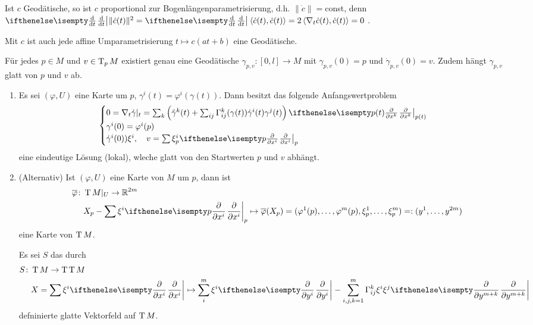 Ist $c$ Geodätische, so ist $c$ proportional zur Bogenlängenparametrisierung, d.h. $\|\dot c\| = $const, denn $\difffrac{}{t}\|\dot c(t)\|^{2} = \difffrac{}{t}\left<\dot c(t),\dot c(t) \right> = 2\left<\nabla_t\dot c(t), \dot c(t)\right> = 0$ .

Mit $c$ ist auch jede affine Umparametrisierung $t \mapsto c(at + b)$ eine Geodätische.

\begin{Prop}
  Für jedes $p \in M$ und $v \in \operatorname{T}_pM$ existiert genau eine Geodätische $\gamma_{p,v}\colon[0,l] \to M$ mit $\gamma_{p,v}(0) = p$ und $\dot \gamma_{p,v}(0) = v$.
Zudem hängt $\gamma_{p,v}$ glatt von $p$ und $v$ ab.
\end{Prop}

\begin{bew}
  \begin{enumerate}[label=(\Alph*)]
  \item Es sei $(\varphi, U)$ eine Karte um $p$, $\gamma^i(t) = \varphi^i(\gamma(t))$. Dann besitzt das folgende Anfangswertproblem
    \begin{align*}
      \begin{cases}
        0 = \nabla_t\dot \gamma|_t = \sum_k\left(\ddot \gamma^k(t) + \sum_{ij}\Gamma_{ij}^k(\gamma(t))\dot \gamma^i(t)\gamma^j(t)\right) \pdifffrac[p(t)]{}{x^k}\\
        \gamma^i(0) = \varphi^i(p)\\
        \dot\gamma^i(0) ) \xi^i, \quad v = \sum \xi^i_p\pdifffrac[p]{}{x^i}
      \end{cases}
    \end{align*}
    eine eindeutige Lösung (lokal), wleche glatt von den Startwerten $p$ und $v$ abhängt.
  \item (Alternativ)
    Ist $(\varphi, U)$ eine Karte von $M$ um $p$, dann ist
    \begin{align*}
      \overline \varphi \colon & \T M|_U \to \R^{2m}\\
      & X_p-\sum \xi^i\pdifffrac[p]{}{x^i} \mapsto \overline\varphi(X_p) = (\varphi^1(p), \ldots, \varphi^m(p), \xi_p^1, \ldots, \xi_p^m) =: (y^1, \ldots, y^{2m})
    \end{align*}
    eine Karte von $\operatorname{T} M$.

    Es sei $S$ das durch
    \begin{align*}
      S \colon & \T M \to \T\T M\\
      & X = \sum \xi^i \pdifffrac{}{x^i} \mapsto \sum_i^m \xi^i \pdifffrac{}{y^i} - \sum_{i,j,k=1}^{m} \Gamma_{ij}^k \xi^i\xi^j\pdifffrac{}{y^{m+k}}
    \end{align*}
    defninierte glatte Vektorfeld auf $\operatorname{T} M$.


\end{enumerate}
\end{bew}
